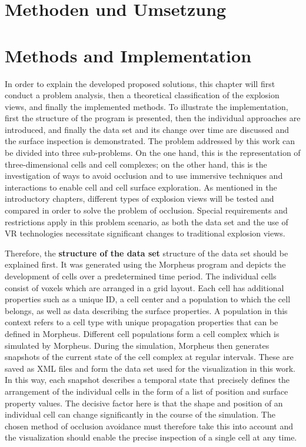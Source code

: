 {\chapter{Methoden und Umsetzung}}
{\chapter{Methods and Implementation}}
\label{sec:methods}


In order to explain the developed proposed solutions, this chapter will first conduct a problem analysis, then a theoretical classification of the explosion views, and finally the implemented methods. 
To illustrate the implementation, first the structure of the program is presented, then the individual approaches are introduced, and finally the data set and its change over time are discussed and the surface inspection is demonstrated.
The problem addressed by this work can be divided into three sub-problems. On the one hand, this is the representation of three-dimensional cells and cell complexes; on the other hand, this is the investigation of ways to avoid occlusion and to use immersive techniques and interactions to enable cell and cell surface exploration.
As mentioned in the introductory chapters, different types of explosion views will be tested and compared in order to solve the problem of occlusion.
Special requirements and restrictions apply in this problem scenario, as both the data set and the use of VR technologies necessitate significant changes to traditional explosion views.

Therefore, the \textbf{structure of the data set }structure of the data set should be explained first. %
It was generated using the Morpheus program and depicts the development of cells over a predetermined time period.
The individual cells consist of voxels which are arranged in a grid layout. Each cell has additional properties such as a unique ID, a cell center and a population to which the cell belongs, as well as data describing the surface properties. 
A population in this context refers to a cell type with unique propagation properties that can be defined in Morpheus.
Different cell populations form a cell complex which is simulated by Morpheus. 
During the simulation, Morpheus then generates snapshots of the current state of the cell complex at regular intervals. 
These are saved as XML files and form the data set used for the visualization in this work. 
In this way, each snapshot describes a temporal state that precisely defines the arrangement of the individual cells in the form of a list of position and surface property values.
The decisive factor here is that the shape and position of an individual cell can change significantly in the course of the simulation. 
The chosen method of occlusion avoidance must therefore take this into account and the visualization should enable the precise inspection of a single cell at any time.

